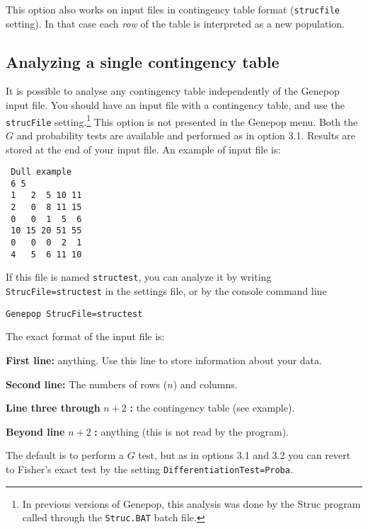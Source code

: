\documentclass[12pt,]{book}
\let\rmarkdownfootnote\footnote%
\def\footnote{\protect\rmarkdownfootnote}
\theoremstyle{definition}
\theoremstyle{definition}
\theoremstyle{definition}
\theoremstyle{remark}
\begin{document}

This option also works on input files in contingency table format
(\texttt{strucfile} setting). In that case each \emph{row} of the table
is interpreted as a new population.

\subsection{Analyzing a single contingency
table}\label{analyzing-a-single-contingency-table}

 It is possible to
analyse any contingency table independently of the Genepop input file.
You should have an input file with a contingency table, and use the
\texttt{strucFile}
setting.\footnote{In previous versions of Genepop,
  this analysis was done by the Struc program called through the
  \texttt{Struc.BAT} batch file.} This option is not presented in the
Genepop menu. Both the \(G\) and probability tests are available and
performed as in option 3.1. Results are stored at the end of your input
file. An example of input file is:

\begin{verbatim}
 Dull example
 6 5
 1   2  5 10 11
 2   0  8 11 15
 0   0  1  5  6
 10 15 20 51 55
 0   0  0  2  1
 4   5  6 11 10
\end{verbatim}

If this file is named \texttt{structest}, you can analyze it by writing
\texttt{StrucFile=structest} in the settings file, or by the console
command line

\begin{verbatim}
Genepop StrucFile=structest
\end{verbatim}

The exact format of the input file is:

\textbf{First line:} anything. Use this line to store information about
your data.

\textbf{Second line:} The numbers of rows (\(n\)) and columns.

\textbf{Line three through} \(n+2\) \textbf{:} the contingency table
(see example).

\textbf{Beyond line} \(n+2\) \textbf{:} anything (this is not read by
the program).

The default is to perform a \(G\) test, but as in options 3.1 and 3.2
you can revert to Fisher's exact test by the setting
\texttt{DifferentiationTest=Proba}.
\end{document}
